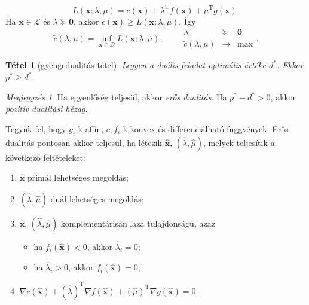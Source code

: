 \documentclass[%
	DIV=15,appendixprefix]{scrreprt}
\newtheorem*{tetel}{Tétel}
\theoremstyle{definition}
\theoremstyle{remark}
\newtheorem*{megj}{Megjegyzés}
\DeclareMathOperator{\T}{T}
\begin{document}
%
\begin{equation*}\tag{Lagrange-függvény}
	L \left( \mathbf{ x };{} \lambda,{} \mu \right) = c \left( \mathbf{ x } \right) + \lambda^{ \T }
	f \left( \mathbf{ x }	\right) + \mu^{ \T } g \left( \mathbf{ x }	\right).
\end{equation*}
Ha $ \mathbf{ x } \in \mathcal{ L } $ és $ \lambda \succeq \mathbf{ 0 } $, akkor $ c \left(
\mathbf{ x } \right) \ge L \left( \mathbf{ x };{} \lambda,{} \mu \right) $. Így
\begin{equation}\tag{duális célfüggény, duális feladat}
	\tilde{ c } \left( \lambda,{} \mu \right) = \inf_{ \mathbf{ x } \in \mathcal{ D } } L \left(
	\mathbf{ x };{} \lambda,{} \mu \right), \qquad \begin{array}{rcl}
		\lambda										&		\succeq	&	\mathbf{ 0 }\\
		\hline
		\tilde{ c } \left( \lambda,{} \mu \right)	&	\rightarrow	&	\max
	\end{array}.
\end{equation}
\begin{tetel}[gyengedualitás-tétel]
	Legyen a duális feladat optimális értéke $ d^{ * } $. Ekkor $ p^{ * } \ge d^{ * } $.
\end{tetel}
\begin{megj}
	Ha egyenlőség teljesül, akkor \emph{erős dualitás}. Ha $ p^{ * } - d^{ * } > 0 $, akkor
	\emph{pozitív dualitási hézag}.
\end{megj}
%
Tegyük fel, hogy $ g_{ i } $-k affin, $ c,{} f_{ i } $-k konvex és differenciálható függvények. Erős dualitás pontosan akkor teljesül, ha létezik $ \hat{ \mathbf{ x } } $, $ \left( \hat{ \lambda }
,{} \hat{ \mu } \right) $, melyek teljesítik a következő feltételeket:
\begin{enumerate}[label = (KKT--\arabic{*}), ref = KKT--\arabic{*}, mode = unboxed,%
	labelindent = \parindent, leftmargin = *]
	\item\label{kkt1} $ \hat{ \mathbf{ x } } $ primál lehetséges megoldás;
	\item\label{kkt2} $ \left( \hat{ \lambda },{} \hat{ \mu } \right) $ duál lehetséges megoldás;
	\item\label{kkt3} $ \hat{ \mathbf{ x } } $, $ \left( \hat{ \lambda },{} \hat{ \mu } \right) $
	komplementárisan laza tulajdonságú, azaz
		\begin{itemize}
			\item ha $ f_{ i } \left( \hat{ \mathbf{ x } } \right) < 0 $, akkor
				$ \hat{ \lambda }_{ i } = 0 $;
			\item ha $ \hat{ \lambda }_{ i } > 0 $, akkor $ f_{ i } \left( \hat{ \mathbf{ x } }
				\right) = 0 $;
		\end{itemize}
	\item\label{kkt4} $ \nabla c \left( \hat{ \mathbf{ x } } \right) + \left( \hat{ \lambda }
		\right)^{ \T } \nabla f \left( \hat{ \mathbf{ x } } \right) + \left( \hat{ \mu }
		\right)^{ \T } \nabla g \left( \hat{ \mathbf{ x } } \right) = 0 $.
\end{enumerate}
\end{document}
